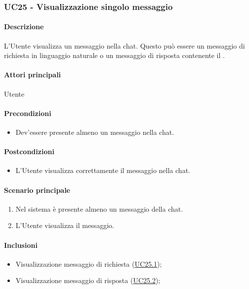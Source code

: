 \subsubsection{UC25 - Visualizzazione singolo messaggio}\label{UC25}
\paragraph*{Descrizione}
L'Utente visualizza un messaggio nella chat. Questo può essere un messaggio di richiesta in linguaggio naturale o un messaggio di risposta contenente il . 

\paragraph*{Attori principali}
Utente

\paragraph*{Precondizioni}
\begin{itemize}
  \item Dev'essere presente almeno un messaggio nella chat.
\end{itemize}

\paragraph*{Postcondizioni}
\begin{itemize}
  \item L'Utente visualizza correttamente il messaggio nella chat.
\end{itemize}

\paragraph*{Scenario principale}
\begin{enumerate}
  \item Nel sistema è presente almeno un messaggio della chat.
  \item L'Utente visualizza il messaggio.
\end{enumerate}

\paragraph*{Inclusioni}
\begin{itemize}
    \item Visualizzazione messaggio di richiesta (\hyperref[UC25point1]{UC25.1});
    \item Visualizzazione messaggio di risposta (\hyperref[UC25point2]{UC25.2});
\end{itemize}

